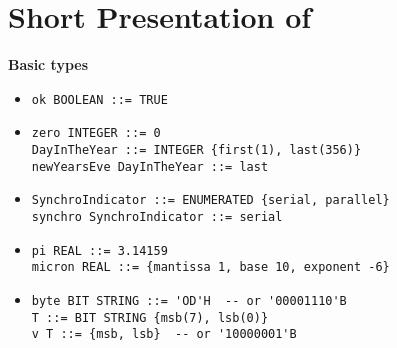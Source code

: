 \documentclass[12pt]{article}
\begin{document}
\section{Short Presentation of \ASN}
\begin{slide}

\noindent
\textbf{Basic types}

\begin{itemize}

  \item \verb+ok BOOLEAN ::= TRUE+


  \item 

\begin{verbatim} 
zero INTEGER ::= 0 
DayInTheYear ::= INTEGER {first(1), last(356)}
newYearsEve DayInTheYear ::= last
\end{verbatim}

  \item 
\begin{verbatim}
SynchroIndicator ::= ENUMERATED {serial, parallel}
synchro SynchroIndicator ::= serial
\end{verbatim}

  \item

\begin{verbatim}
pi REAL ::= 3.14159
micron REAL ::= {mantissa 1, base 10, exponent -6}
\end{verbatim}

  \item 

\begin{verbatim}
byte BIT STRING ::= 'OD'H  -- or '00001110'B
T ::= BIT STRING {msb(7), lsb(0)}
v T ::= {msb, lsb}  -- or '10000001'B
\end{verbatim}




\end{itemize}
\end{slide}
\end{document}
